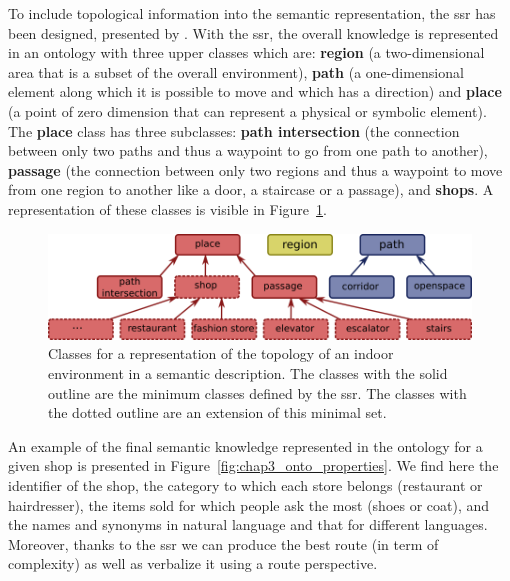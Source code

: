 \documentclass[a4paper,11pt,twoside]{StyleThese}
\begin{document}
To include topological information into the semantic representation, the \acrfull{ssr} has been designed, presented by \cite{sarthou_2019_semantic}. With the \acrshort{ssr}, the overall knowledge is represented in an ontology with three upper classes which are: \textbf{region} (\ie a two-dimensional area that is a subset of the overall environment), \textbf{path} (\ie a one-dimensional element along which it is possible to move and which has a direction) and \textbf{place} (\ie a point of zero dimension that can represent a physical or symbolic element). The \textbf{place} class has three subclasses: \textbf{path intersection} (\ie the connection between only two paths and thus a waypoint to go from one path to another), \textbf{passage} (\ie the connection between only two regions and thus a waypoint to move from one region to another like a door, a staircase or a passage), and \textbf{shops}. A representation of these classes is visible in Figure~\ref{fig:chap3_onto_classes}.

\begin{figure}[!ht]
	\centering
	\includegraphics[scale=0.45]{figures/chapter3/classes.png}
	\caption{\label{fig:chap3_onto_classes} Classes for a representation of the topology of an indoor environment in a semantic description. The classes with the solid outline are the minimum classes defined by the \acrshort{ssr}. The classes with the dotted outline are an extension of this minimal set.}
\end{figure}

An example of the final semantic knowledge represented in the ontology for a given shop is presented in Figure~\ref{fig:chap3_onto_properties}. We find here the identifier of the shop, the category to which each store belongs (\eg restaurant or hairdresser), the items sold for which people ask the most (\eg shoes or coat), and the names and synonyms in natural language and that for different languages.
Moreover, thanks to the \acrshort{ssr} we can produce the best route (in term of complexity) as well as verbalize it using a route perspective.
\end{document}
